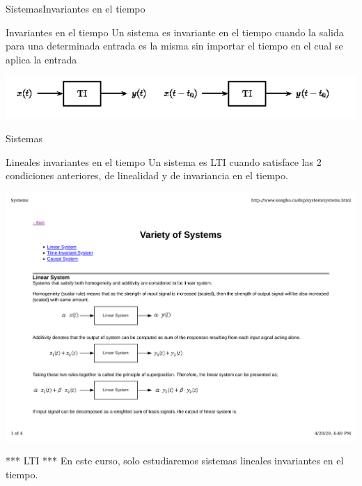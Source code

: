       \begin{frame}{Sistemas}{Invariantes en el tiempo}
         \begin{block}{Invariantes en el tiempo}
            Un sistema es invariante en el tiempo cuando la salida para una determinada entrada es la misma sin importar el tiempo en el cual se aplica la entrada
         \end{block}
         \center\includegraphics[width=1\textwidth]{1_clase/invariante_en_tiempo} \\
         \vfill
      \end{frame}
      \begin{frame}{Sistemas}{}
         \begin{block}{Lineales invariantes en el tiempo}
            Un sistema es LTI cuando satisface las 2 condiciones anteriores, de linealidad y de invariancia en el tiempo.
         \end{block}
         \center\includegraphics[width=1\textwidth]{1_clase/lti}
         \vfill
         \begin{alertblock}{*** LTI ***}
            En este curso, \alert{solo} estudiaremos sistemas lineales invariantes en el tiempo.
         \end{alertblock}
      \end{frame}
